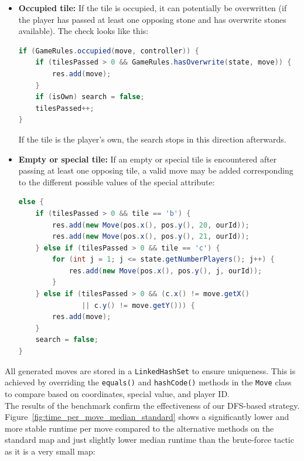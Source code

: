 \begin{itemize}
    \item \textbf{Occupied tile:}  
    If the tile is occupied, it can potentially be overwritten (if the player has passed at least one opposing stone and has overwrite stones available). The check looks like this:

\begin{lstlisting}[language=Java, basicstyle=\ttfamily\small, breaklines=false]
if (GameRules.occupied(move, controller)) {
    if (tilesPassed > 0 && GameRules.hasOverwrite(state, move)) {
        res.add(move);
    }
    if (isOwn) search = false;
    tilesPassed++;
}
\end{lstlisting}

If the tile is the player's own, the search stops in this direction afterwards.

    \item \textbf{Empty or special tile:}  
    If an empty or special tile is encountered after passing at least one opposing tile, a valid move may be added corresponding to the different possible values of the special attribute:

\begin{lstlisting}[language=Java, basicstyle=\ttfamily\small, breaklines=false]
else {
    if (tilesPassed > 0 && tile == 'b') {
        res.add(new Move(pos.x(), pos.y(), 20, ourId));
        res.add(new Move(pos.x(), pos.y(), 21, ourId));
    } else if (tilesPassed > 0 && tile == 'c') {
        for (int j = 1; j <= state.getNumberPlayers(); j++) {
            res.add(new Move(pos.x(), pos.y(), j, ourId));
        }
    } else if (tilesPassed > 0 && (c.x() != move.getX() 
               || c.y() != move.getY())) {
        res.add(move);
    }
    search = false;
}
\end{lstlisting}
\end{itemize}



\noindent All generated moves are stored in a \texttt{LinkedHashSet} to ensure uniqueness. This is achieved by overriding the \texttt{equals()} and \texttt{hashCode()} methods in the \texttt{Move} class to compare based on coordinates, special value, and player ID.\\

\noindent The results of the benchmark confirm the effectiveness of our DFS-based strategy. Figure~\ref{fig:time_per_move_median_standard} shows a significantly lower and more stable runtime per move compared to the alternative methods on the standard map and just slightly lower median runtime than the brute-force tactic as it is a very small map:

